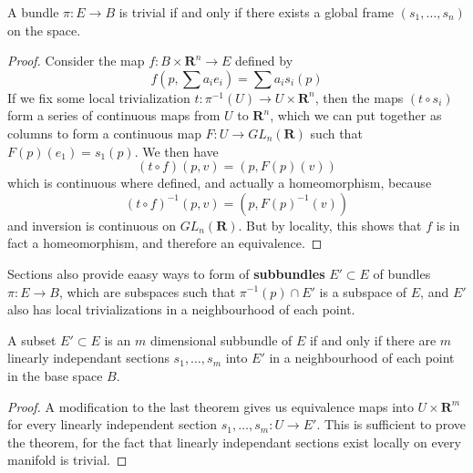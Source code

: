 \begin{theorem}
    A bundle $\pi: E \to B$ is trivial if and only if there exists a global frame $(s_1, \dots, s_n)$ on the space.
\end{theorem}
\begin{proof}
    Consider the map $f: B \times \mathbf{R}^n \to E$ defined by
    \[ f \left(p,\sum a_i e_i \right) = \sum a_i s_i(p) \]
    If we fix some local trivialization $t: \pi^{-1}(U) \to U \times \mathbf{R}^n$, then the maps $(t \circ s_i)$ form a series of continuous maps from $U$ to $\mathbf{R}^n$, which we can put together as columns to form a continuous map $F: U \to GL_n(\mathbf{R})$ such that $F(p)(e_1) = s_1(p)$. We then have
    \[ (t \circ f)\left(p,v \right) = \left( p, F(p)(v) \right) \]
    which is continuous where defined, and actually a homeomorphism, because
    \[ (t \circ f)^{-1}(p,v) = (p, F(p)^{-1}(v)) \]
    and inversion is continuous on $GL_n(\mathbf{R})$. But by locality, this shows that $f$ is in fact a homeomorphism, and therefore an equivalence.
\end{proof}

Sections also provide eaasy ways to form of {\bf subbundles} $E' \subset E$ of bundles $\pi: E \to B$, which are subspaces such that $\pi^{-1}(p) \cap E'$ is a subspace of $E$, and $E'$ also has local trivializations in a neighbourhood of each point.

\begin{theorem}
    A subset $E' \subset E$ is an $m$ dimensional subbundle of $E$ if and only if there are $m$ linearly independant sections $s_1, \dots, s_m$ into $E'$ in a neighbourhood of each point in the base space $B$.
\end{theorem}
\begin{proof}
    A modification to the last theorem gives us equivalence maps into $U \times \mathbf{R}^m$ for every linearly independent section $s_1, \dots, s_m : U \to E'$. This is sufficient to prove the theorem, for the fact that linearly independant sections exist locally on every manifold is trivial.
\end{proof}

